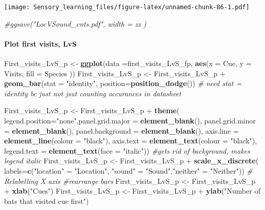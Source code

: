 \documentclass[]{article}
\newenvironment{Shaded}{\begin{snugshade}}{\end{snugshade}}
\newcommand{\KeywordTok}[1]{\textcolor[rgb]{0.13,0.29,0.53}{\textbf{{#1}}}}
\newcommand{\DataTypeTok}[1]{\textcolor[rgb]{0.13,0.29,0.53}{{#1}}}
\newcommand{\StringTok}[1]{\textcolor[rgb]{0.31,0.60,0.02}{{#1}}}
\newcommand{\CommentTok}[1]{\textcolor[rgb]{0.56,0.35,0.01}{\textit{{#1}}}}
\newcommand{\NormalTok}[1]{{#1}}
\let\oldparagraph\paragraph
\renewcommand{\paragraph}[1]{\oldparagraph{#1}\mbox{}}
\begin{document}
\texttt{[image: Sensory\_learning\_files/figure-latex/unnamed-chunk-86-1.pdf]}

\begin{Shaded}
\begin{Highlighting}[]
\CommentTok{#ggsave("LocVSound_cnts.pdf", width = zz  )}
\end{Highlighting}
\end{Shaded}

\paragraph{Plot first visits, LvS}\label{plot-first-visits-lvs-1}

\begin{Shaded}
\begin{Highlighting}[]
\NormalTok{First_visits_LvS_p <-}\StringTok{ }\KeywordTok{ggplot}\NormalTok{(}\DataTypeTok{data =}\NormalTok{first_visits_LvS_fp, }\KeywordTok{aes}\NormalTok{(}\DataTypeTok{x =} \NormalTok{Cue, }\DataTypeTok{y =} \NormalTok{Visits, }\DataTypeTok{fill =} \NormalTok{Species ))}
\NormalTok{First_visits_LvS_p <-}\StringTok{ }\NormalTok{First_visits_LvS_p +}\StringTok{ }\KeywordTok{geom_bar}\NormalTok{(}\DataTypeTok{stat =} \StringTok{"identity"}\NormalTok{, }\DataTypeTok{position=}\KeywordTok{position_dodge}\NormalTok{()) }\CommentTok{# need stat = identity bc just not jsut counting occurances in datasheet}

\NormalTok{First_visits_LvS_p  <-}\StringTok{ }\NormalTok{First_visits_LvS_p  +}\StringTok{  }\KeywordTok{theme}\NormalTok{( }\DataTypeTok{legend.position=}\StringTok{"none"}\NormalTok{,}\DataTypeTok{panel.grid.major =} \KeywordTok{element_blank}\NormalTok{(), }\DataTypeTok{panel.grid.minor =} \KeywordTok{element_blank}\NormalTok{(),}
\DataTypeTok{panel.background =} \KeywordTok{element_blank}\NormalTok{(), }\DataTypeTok{axis.line =} \KeywordTok{element_line}\NormalTok{(}\DataTypeTok{colour =} \StringTok{"black"}\NormalTok{), }\DataTypeTok{axis.text =} \KeywordTok{element_text}\NormalTok{(}\DataTypeTok{colour =} \StringTok{"black"}\NormalTok{), }\DataTypeTok{legend.text =} \KeywordTok{element_text}\NormalTok{(}\DataTypeTok{face =} \StringTok{"italic"}\NormalTok{))  }\CommentTok{#gets rid of background, makes legend italic}
\NormalTok{First_visits_LvS_p  <-}\StringTok{ }\NormalTok{First_visits_LvS_p  +}\StringTok{ }\KeywordTok{scale_x_discrete}\NormalTok{( }\DataTypeTok{labels=}\KeywordTok{c}\NormalTok{(}\StringTok{"location"} \NormalTok{=}\StringTok{ "Location"}\NormalTok{, }\StringTok{"sound"} \NormalTok{=}\StringTok{ "Sound"}\NormalTok{,}\StringTok{"neither"} \NormalTok{=}\StringTok{ "Neither"}\NormalTok{))  }\CommentTok{# Relabelling X axis #rearrange bars}
\NormalTok{First_visits_LvS_p  <-}\StringTok{ }\NormalTok{First_visits_LvS_p  +}\StringTok{ }\KeywordTok{xlab}\NormalTok{(}\StringTok{"Cues"}\NormalTok{)}
\NormalTok{First_visits_LvS_p  <-}\StringTok{ }\NormalTok{First_visits_LvS_p  +}\StringTok{ }\KeywordTok{ylab}\NormalTok{(}\StringTok{"Number of bats that visited cue first"}\NormalTok{)}


\end{Highlighting}
\end{Shaded}
\end{document}
